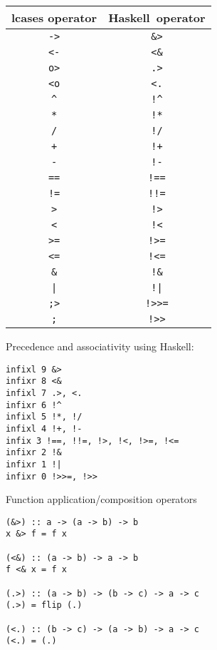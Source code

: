 \documentclass{article}
\def\H{Haskell}
\begin{document}
\begin{table}[ht]
\hspace{0.5cm}
\begin{minipage}{0.45\linewidth}\centering
\begin{tabular}{ |c|c| }
\hline
lcases operator & \H\ operator
\\
\hline
\hline
\verb|->| & \verb|&>|
\\
\hline
\verb|<-| & \verb|<&|
\\
\hline
\verb|o>| & \verb|.>|
\\
\hline
\verb|<o| & \verb|<.|
\\
\hline
\verb|^| & \verb|!^|
\\
\hline
\verb|*| & \verb|!*|
\\
\hline
\verb|/| & \verb|!/|
\\
\hline
\verb|+| & \verb|!+|
\\
\hline
\verb|-| & \verb|!-|
\\
\hline
\verb|==| & \verb|!==|
\\
\hline
\verb|!=| & \verb|!!=|
\\
\hline
\verb|>| & \verb|!>|
\\
\hline
\verb|<| & \verb|!<|
\\
\hline
\verb|>=| & \verb|!>=|
\\
\hline
\verb|<=| & \verb|!<=|
\\
\hline
\verb|&| & \verb|!&|
\\
\hline
\texttt{|} & \texttt{!|}
\\
\hline
\verb|;>| & \verb|!>>=|
\\
\hline
\verb|;| & \verb|!>>|
\\
\hline
\end{tabular}
\end{minipage}
\hspace{1cm}
\begin{minipage}{0.45\linewidth}

Precedence and associativity using \H:
\begin{verbatim}
infixl 9 &>
infixr 8 <&
infixl 7 .>, <.
infixr 6 !^
infixl 5 !*, !/
infixl 4 !+, !-
infix 3 !==, !!=, !>, !<, !>=, !<=
infixr 2 !&
infixr 1 !|
infixr 0 !>>=, !>>
\end{verbatim}

Function application/composition operators
\begin{verbatim}
(&>) :: a -> (a -> b) -> b
x &> f = f x

(<&) :: (a -> b) -> a -> b
f <& x = f x

(.>) :: (a -> b) -> (b -> c) -> a -> c
(.>) = flip (.)

(<.) :: (b -> c) -> (a -> b) -> a -> c
(<.) = (.)
\end{verbatim}
\end{minipage}
\end{table}
\end{document}
